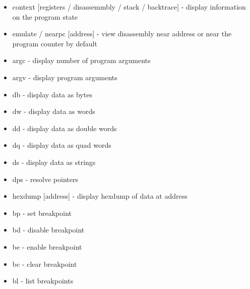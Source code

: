 \begin{itemize}
    \item context [registers / disassemmbly / stack / backtrace] - display
        information on the program state
    \item emulate / nearpc [address] - view disassembly near address or near the
        program counter by default
    \item argc - display number of program arguments
    \item argv - display program arguments
    \item db - display data as bytes
    \item dw - display data as words
    \item dd - display data as double words
    \item dq - display data as quad words
    \item ds - display data as strings
    \item dps - resolve pointers
    \item hexdump [address] - display hexdump of data at address
    \item bp - set breakpoint
    \item bd - disable breakpoint
    \item be - enable breakpoint
    \item bc - clear breakpoint
    \item bl - list breakpoints
\end{itemize}
